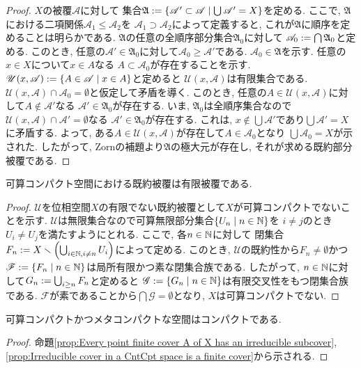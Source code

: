 \documentclass[uplatex, dvipdfmx, a4paper, 12pt, class=jsbook, crop=false]{standalone}
\begin{document}
\begin{proof}
	$ X $の被覆$ \mathscr{A} $に対して
	集合$ \mathfrak{A} \defeq \setcomp{\mathscr{A}' \subset \mathscr{A}}{\bigcup \mathscr{A}' = X} $を定める. 
	ここで, $ \mathfrak{A} $における二項関係$ \mathscr{A}_1 \leq \mathscr{A}_2 $を
	$ \mathscr{A}_1 \supset \mathscr{A}_2 $によって定義すると, 
	これが$ \mathfrak{A} $に順序を定めることは明らかである. 
	$ \mathfrak{A} $の任意の全順序部分集合$ \mathfrak{A}_0 $に対して
	$ \mathscr{A}_0 \mathrel{:=} \bigcap \mathfrak{A}_0 $と定める. 
	このとき, 任意の$ \mathscr{A}' \in \mathfrak{A}_0 $に対して$ \mathscr{A}_0 \geq \mathscr{A}' $である. 
	$ \mathscr{A}_0 \in \mathfrak{A} $を示す. 任意の$ x \in X $について$ x \in A $なる
	$ A \subset \mathscr{A}_0 $が存在することを示す. 
	$ \mathscr{U}(x, \mathscr{A}) \defeq \setcomp{A \in \mathscr{A}}{x \in A} $と定めると
	$ \mathscr{U}(x, \mathscr{A}) $は有限集合である. 
	$ \mathscr{U}(x, \mathscr{A}) \cap \mathscr{A}_0 = \emptyset $と仮定して矛盾を導く. 
	このとき, 任意の$ A \in \mathscr{U}(x, \mathscr{A}) $に対して$ A \notin \mathscr{A}' $なる
	$ \mathscr{A}' \in \mathfrak{A}_0 $が存在する. 
	いま, $ \mathfrak{A}_0 $は全順序集合なので
	$ \mathscr{U}(x, \mathscr{A}) \cap \mathscr{A}' = \emptyset $なる
	$ \mathscr{A}' \in \mathfrak{A}_0 $が存在する. 
	これは, $ x \notin \bigcup \mathscr{A}' $であり$ \bigcup \mathscr{A}' = X $に矛盾する. 
	よって, ある$ A \in \mathscr{U}(x, \mathscr{A}) $が存在して$ A \in \mathscr{A}_0 $となり
	$ \bigcup \mathscr{A}_0 = X $が示された. したがって, Zornの補題より$ \mathfrak{A} $の極大元が存在し, 
	それが求める既約部分被覆である.
\end{proof}

\begin{proposition}
	\label{prop:Irreducible cover in a CntCpt space is a finite cover}
	可算コンパクト空間における既約被覆は有限被覆である.
\end{proposition}

\begin{proof}
	$ \mathscr{U} $を位相空間$ X $の有限でない既約被覆として$ X $が可算コンパクトでないことを示す. 
	$ \mathscr{U} $は無限集合なので可算無限部分集合$ \setcomp{U_n}{n \in \N} $を
	$ i \neq j $のとき$ U_i \neq U_j $を満たすようにとれる. ここで, 各$ n \in \mathbb{N} $に対して
	閉集合$ F_n \mathrel{:=} X \smallsetminus \left(\bigcup_{i \in \mathbb{N}, i \neq n} U_i\right) $によって定める.
	このとき, $ \mathscr{U} $の既約性から$ F_n \neq \emptyset $かつ
	$ \mathscr{F} \defeq \setcomp{F_n}{n \in \N} $は局所有限かつ素な閉集合族である.
	したがって, $ n \in \mathbb{N} $に対して$ G_n \mathrel{:=} \bigcup_{i \geq n} F_n $と定めると
	$ \mathscr{G} \defeq \setcomp{G_n}{n \in \N} $は有限交叉性をもつ閉集合族である.
	$ \mathscr{F} $が素であることから$ \bigcap \mathscr{G} = \emptyset $となり, $ X $は可算コンパクトでない.
\end{proof}

\begin{proposition}
	\label{prop:CntCpt + MetaCpt > Cpt}
	可算コンパクトかつメタコンパクトな空間はコンパクトである.
\end{proposition}

\begin{proof} 
	命題\ref{prop:Every point finite cover A of X has an irreducible subcover}, 
	\ref{prop:Irreducible cover in a CntCpt space is a finite cover}から示される.
\end{proof}
\end{document}
